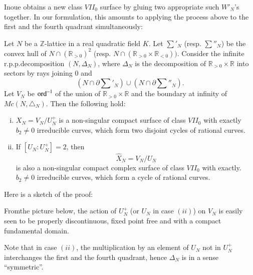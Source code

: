 Inoue\pageoriginale \cite{keyI3} obtains a new class $VII_0$ surface by
gluing two appropriate such $W'_N$'s together. In our formulation,
this amounts to applying the process above to the first and the fourth
quadrant simultaneously:  

\begin{theorem}[Inoue]\label{chap2:thm15.1}
 Let $N$ be a $\mathbb{Z}$-lattice in a real quadratic
  field $K$.  Let $\sum'_N$ (resp. $\sum''_N$) be the convex hull of $N
  \cap (\mathbb{R}_{>0})^{2}$ (resp. $N \cap (\mathbb{R}_{>0} \times
  \mathbb{R}_{<0}))$. Consider the infinite r.p.p.decomposition
  $(N, \Delta_N)$, where $\Delta_N$ is the decomposition of
  $\mathbb{R}_{>0} \times \mathbb{R}$ into sectors by rays joining 0 and  
$$ 
(N \cap \partial \sum'_N)  \cup (N \cap \partial \sum''_N). 
$$
Let $V_N$ be $\operatorname{ord}^{-1}$ of the union of $\mathbb{R}_{>0} \times \mathbb{R}$
and the boundary at infinity of $Mc(N,\triangle_N)$. Then the
following hold:  
\begin{enumerate}[(i)]
\item \qquad $X_N = V_N/ U^+_N$ is a non-singular compact surface of
  class $VII_0$ with exactly $b_2 \neq 0$ irreducible curves, which
  form two disjoint cycles of rational curves.  

\item If $[U_N : U^+_N] = 2$, then 
$$
\hat{X}_N = V_N/ U_N
$$
is also a non-singular compact complex surface of class $VII_0$ with
exactly. $b_2 \neq 0$ irreducible curves, which form a cycle of
rational curves.  
\end{enumerate}
\end{theorem}

Here is a sketch of the proof: 

From\pageoriginale the picture below, the action of $U^+_N$ (or $U_N$
in case $(ii)$) 
on $V_N$ is easily seen to be properly discontinuous, fixed point free
and with a compact fundamental domain. 

Note that in case $(ii)$, the multiplication by an element of $U_N$
not in $U^+_N$ interchanges the first and the fourth quadrant, hence
$\Delta_N$ is in a sense ``symmetric''.  

